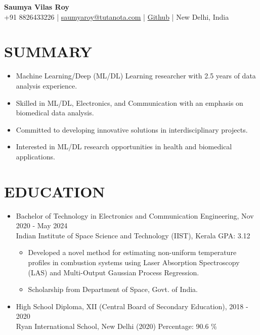 \documentclass[11pt]{article}
\begin{document}
	
	\begin{center}
		{\huge\bf Saumya Vilas Roy} \\
		
		\vspace{3mm} %
		{\large
			+91 8826433226 |
			\href{mailto:saumyaroy@tutanota.com}{saumyaroy@tutanota.com} |
				\href{https://4d2.link/saumya}{Github} |
			New Delhi, India
		} \\
		{
	
		}
	\end{center}
	
	\section*{\bf SUMMARY}
	\begin{itemize}[leftmargin=*,noitemsep,topsep=0pt]
		\item Machine Learning/Deep (ML/DL) Learning researcher with 2.5 years of data analysis experience.
		\item Skilled in ML/DL, Electronics, and Communication with an emphasis on biomedical data analysis.
		\item Committed to developing innovative solutions in interdisciplinary projects.
		\item Interested in ML/DL research opportunities in health and biomedical applications.
	\end{itemize}
	
	\section*{\bf EDUCATION}
	\begin{itemize}[leftmargin=*,noitemsep,topsep=0pt]
		\item Bachelor of Technology in Electronics and Communication Engineering, \hfill Nov 2020 - May 2024 \\
		Indian Institute of Space Science and Technology (IIST), Kerala \hfill GPA: 3.12
		\begin{itemize}[leftmargin=*,noitemsep,topsep=0pt]
			\item Developed a novel method for estimating non-uniform temperature profiles in combustion systems using Laser Absorption Spectroscopy (LAS) and Multi-Output Gaussian Process Regression.
			\item Scholarship from Department of Space, Govt. of India.
		\end{itemize}
		\item High School Diploma, XII (Central Board of Secondary Education), \hfill 2018 - 2020\\
		Ryan International School, New Delhi (2020)  \hfill Percentage: 90.6 \%
	\end{itemize}
	
\end{document}
